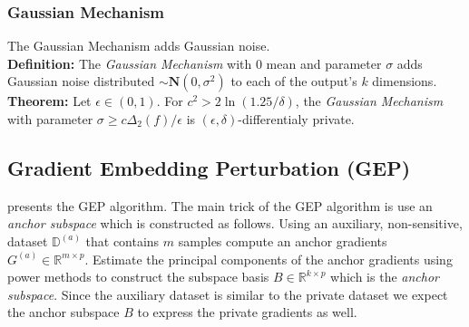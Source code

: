 \subsubsection{Gaussian Mechanism}
The Gaussian Mechanism adds Gaussian noise. \\
\textbf{Definition:} The \textit{Gaussian Mechanism} with 0 mean and parameter $\sigma$ adds Gaussian noise distributed $\sim \mathbf{N}(0,\sigma^{2})$ to each of the output's $k$ dimensions.\\
\textbf{Theorem:} Let $\epsilon \in (0,1)$. For $c^{2} > 2 \ln(1.25/\delta)$, the \textit{Gaussian Mechanism} with parameter $\sigma \geq c\Delta_{2}(f)/\epsilon$ is $(\epsilon, \delta)$-differentialy private.

\subsection{Gradient Embedding Perturbation (GEP)}
\label{GEP}
\cite{Yu2021DoLearning} presents the GEP algorithm. The main trick of the GEP algorithm is use an \textit{anchor subspace} which is constructed as follows. Using an auxiliary, non-sensitive, dataset $\mathbb{D}^{(a)}$ that contains $m$ samples compute an anchor gradients $G^{(a)} \in \mathbb{R}^{m \times p}$. Estimate the principal components of the anchor gradients using power methods to construct the subspace basis $B \in \mathbb{R}^{k \times p}$ which is the \textit{anchor subspace}. Since the auxiliary dataset is similar to the private dataset we expect the anchor subspace $B$ to express the private gradients as well. 

